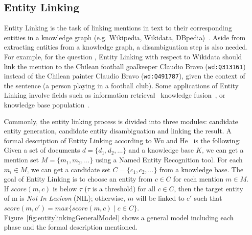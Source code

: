 \subsection{Entity Linking}
\label{cap2:theoFrame/infExtr/entityLinking}
Entity Linking is the task of linking mentions in text to their corresponding entities in a 
knowledge graph (e.g. Wikipedia, Wikidata, DBpedia)~\cite{EL:survey-WuHH18}. Aside from 
extracting entities from a knowledge graph, a disambiguation step is also needed. For example, 
for the question , Entity Linking 
with respect to Wikidata should link the mention  to the Chilean 
football goalkeeper Claudio Bravo (\texttt{wd:Q313161}) instead of the Chilean painter Claudio Bravo 
(\texttt{wd:Q491787}), given the context of the sentence (a person playing in a football club). 
Some applications of Entity Linking involve fields such as information 
retrieval~\cite{infExtr:CornoltiFCRS16, infExtr:BlancoOM15, infExtr:BollegalaMI07} knowledge 
fusion~\cite{infExtr:DongGHHMSZ15, infExtr:BohmFHLMNEHHS12}, or knowledge base 
population~\cite{infExtr:RaoMD13, infExtr:DredzeMRGF10, infExtr:FreedmanMM17}.

Commonly, the entity linking process is divided into three modules: candidate entity 
generation, candidate entity disambiguation and linking the result. A formal description of 
Entity Linking according to Wu and He~\cite{EL:survey-WuHH18} is the following: Given a set of 
documents $d=\{d_1,d_2,\ldots\}$ and a knowledge base $K$, we can get a mention set 
$M=\{m_1, m_2,\ldots\}$ using a Named Entity Recognition tool. For each $m_i \in M$, we can 
get a candidate set $C=\{c_1, c_2,\ldots\}$ from a knowledge base. The goal of Entity Linking 
is to choose an entity from $c \in C$ for each mention $m \in M$. If $score(m,c)$ is below 
$\tau$ ($\tau$ is a threshold) for all $c \in C$, then the target entity of m is 
\textit{Not In Lexicon} (NIL); otherwise, $m$ will be linked to $c'$ such that 
$score(m,c')=max\{score(m,c) \mid c\in C \}$. Figure~\ref{fig:entitylinkingGeneralModel} shows a 
general model including each phase and the formal description mentioned.

